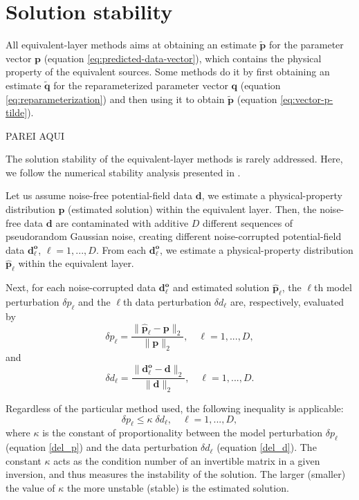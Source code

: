 \section{Solution stability}

All equivalent-layer methods aims at obtaining an estimate $\tilde{\mathbf{p}}$ for the parameter vector 
$\mathbf{p}$ (equation \ref{eq:predicted-data-vector}), which contains the physical property of the equivalent sources.
Some methods do it by first obtaining an estimate $\tilde{\mathbf{q}}$ for the reparameterized parameter vector $\mathbf{q}$
(equation \ref{eq:reparameterization}) and then using it to obtain $\tilde{\mathbf{p}}$ (equation \ref{eq:vector-p-tilde}).

PAREI AQUI

The solution stability of the equivalent-layer methods is rarely addressed.
Here, we follow the numerical stability analysis presented in \cite{siqueira-etal2017}.

Let us assume noise-free potential-field data $\mathbf{d}$, 
we estimate a physical-property distribution $\mathbf{p}$ (estimated solution) within the equivalent layer.
Then, the  noise-free data $\mathbf{d}$ are contaminated with additive $D$ different sequences of 
pseudorandom Gaussian noise, creating  different noise-corrupted potential-field data
$\mathbf{d}^\mathbf{o}_\ell$, $\ell = 1, ..., D$.
From each $\mathbf{d}^\mathbf{o}_\ell$, we estimate a physical-property distribution 
$\mathbf{\hat{p}}_\ell$ within the equivalent layer. 

Next, for each noise-corrupted data $\mathbf{d}^\mathbf{o}_\ell$
and estimated solution $\mathbf{\hat{p}}_\ell$, the $\ell$th model perturbation $\delta p_\ell $
and the $\ell$th data perturbation    $\delta d_\ell$ are,  respectively, evaluated by
\begin{equation}
\delta p_\ell = \frac{\parallel \mathbf{\hat{p}}_\ell - {\mathbf{p}} \parallel_2 }
{\parallel {\mathbf{p}} \parallel _2 }, \quad \ell= 1, ..., D,
\label{del_p}
\end{equation}
and
\begin{equation}
\delta d_\ell = \frac{\parallel \mathbf{d}^\mathbf{o}_\ell - \mathbf{d} \parallel _2 }
{\parallel \mathbf{d}\parallel _2}, \quad \ell = 1, ..., D.
\label{del_d}
\end{equation}

Regardless of the particular method used, the following inequality \citep[][ p. 66]{aster2018parameter}  is applicable:
\begin{equation}
\delta p_\ell \leq \kappa \; \delta d_\ell, \quad \ell = 1, ..., D,
\label{condition_number}
\end{equation}
where $\kappa$ is the constant of proportionality between the model perturbation $\delta p_\ell $ 
(equation \ref{del_p}) and the data perturbation   $\delta d_\ell$ (equation \ref{del_d}).
The constant $\kappa$ acts as the condition number of an invertible matrix in a given inversion, and thus
measures the instability of the solution.
The larger (smaller) the value of $\kappa$ the more unstable (stable) is the estimated solution.

